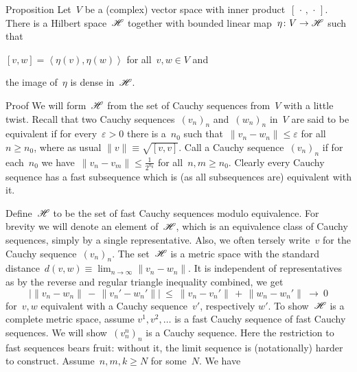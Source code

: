 \documentclass[b]{subfiles}
\begin{document}
\begin{parsec}
\begin{point}{Proposition}%
    Let~$V$ be a (complex) vector space with inner
        product~$[\,\cdot\,,\,\cdot\,]$.
    There is a Hilbert space~$\mathscr{H}$
        together with bounded linear map~$\eta\colon V \to \mathscr{H}$
            such that
        \begin{inparaenum}
        \item
        $[v,w] = \left<\eta(v), \eta(w)\right>$
            for all~$v,w \in V$ and
        \item
        the image of~$\eta$ is dense in~$\mathscr{H}$.
        \end{inparaenum}
\begin{point}{Proof}%
We will form~$\mathscr{H}$ from the set of Cauchy sequences from~$V$
    with a little twist.
Recall that two Cauchy
    sequences~$(v_n)_n$ and~$(w_n)_n$ in~$V$
    are said to be equivalent
    if for every~$\varepsilon > 0$
    there is a~$n_0$
    such that~$\| v_n - w_n \| \leq \varepsilon$
    for all~$n \geq n_0$,
    where as usual $\|v\| \equiv \sqrt{[v,v]}$.
Call a Cauchy sequence~$(v_n)_n$ 
    if for each~$n_0$
    we have~$\| v_n - v_m\| \leq \frac{1}{2^{n_0}}$
    for all~$n,m \geq n_0$.
Clearly every Cauchy sequence has a fast subsequence
    which is (as all subsequences are) equivalent with it.
\begin{point}%
    Define~$\mathscr{H}$ to be the set of fast Cauchy sequences modulo
        equivalence.
For brevity we will denote an element of~$\mathscr{H}$,
    which is an equivalence class of Cauchy sequences, simply by
    a single representative.
Also, we often tersely write~$v$ for the Cauchy sequence~$(v_n)_n$.
The set~$\mathscr{H}$ is a metric space
    with the standard
    distance~$d(v, w) \equiv \lim_{n\to\infty} \| v_n - w_n\|$.
It is independent of representatives
    as by the reverse and regular triangle inequality combined,
     we get
\begin{equation*}
    \bigl| \| v_n - w_n \| \,-\, \| v_n' - w_n' \| \bigr|
        \ \leq \ 
    \| v_n - v_n' \| \,+\, \|w_n - w_n'\| \ \rightarrow \ 0
\end{equation*}
for~$v,w$ equivalent with a Cauchy sequence~$v'$, respectively $w'$.
To show~$\mathscr{H}$ is a complete metric space, assume
$v^1, v^2, \ldots$
is a fast Cauchy sequence of fast Cauchy sequences.
We will show~$(v_n^n)_n$ is a Cauchy sequence.
Here the restriction to fast sequences bears fruit:
without it, the limit sequence is (notationally) harder to construct.
Assume~$n,m,k \geq N$ for some~$N$.  We have

\end{point}
\end{point}
\end{point}
\end{parsec}
\end{document}
